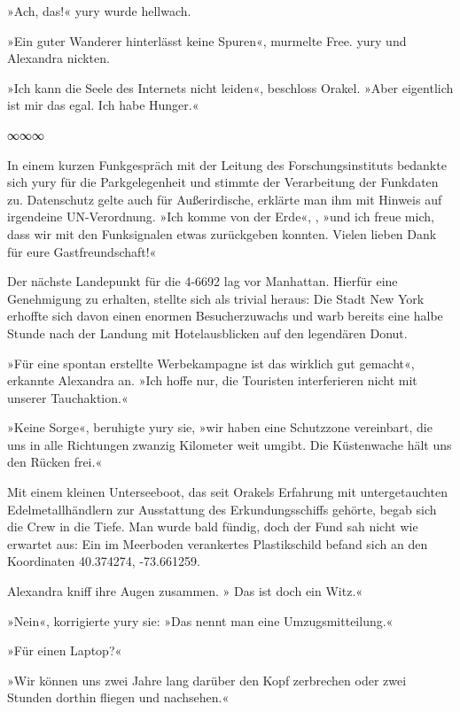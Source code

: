 »Ach, das!« yury wurde hellwach.

»Ein guter Wanderer hinterlässt keine Spuren«, murmelte Free. yury und Alexandra nickten.

»Ich kann die Seele des Internets nicht leiden«, beschloss Orakel. »Aber eigentlich ist mir das egal. Ich habe Hunger.«

\begin{center}
∞∞∞
\end{center}

In einem kurzen Funkgespräch mit der Leitung des Forschungsinstituts bedankte sich yury für die Parkgelegenheit und stimmte der Verarbeitung der Funkdaten zu. Datenschutz gelte auch für Außerirdische, erklärte man ihm mit Hinweis auf irgendeine UN-Verordnung. »Ich komme von der Erde«, , »und ich freue mich, dass wir mit den Funksignalen etwas zurückgeben konnten. Vielen lieben Dank für eure Gastfreundschaft!«

Der nächste Landepunkt für die 4-6692 lag vor Manhattan. Hierfür eine Genehmigung zu erhalten, stellte sich als trivial heraus: Die Stadt New York erhoffte sich davon einen enormen Besucherzuwachs und warb bereits eine halbe Stunde nach der Landung mit Hotelausblicken auf den legendären Donut.

»Für eine spontan erstellte Werbekampagne ist das wirklich gut gemacht«, erkannte Alexandra an. »Ich hoffe nur, die Touristen interferieren nicht mit unserer Tauchaktion.«

»Keine Sorge«, beruhigte yury sie, »wir haben eine Schutzzone vereinbart, die uns in alle Richtungen zwanzig Kilometer weit umgibt. Die Küstenwache hält uns den Rücken frei.«

Mit einem kleinen Unterseeboot, das seit Orakels Erfahrung mit untergetauchten Edelmetallhändlern zur Ausstattung des Erkundungsschiffs gehörte, begab sich die Crew in die Tiefe. Man wurde bald fündig, doch der Fund sah nicht wie erwartet aus: Ein im Meerboden verankertes Plastikschild befand sich an den Koordinaten 40.374274, -73.661259.

Alexandra kniff ihre Augen zusammen. » Das ist doch ein Witz.«

»Nein«, korrigierte yury sie: »Das nennt man eine Umzugsmitteilung.«

»Für einen Laptop?«

»Wir können uns zwei Jahre lang darüber den Kopf zerbrechen oder zwei Stunden dorthin fliegen und nachsehen.«


